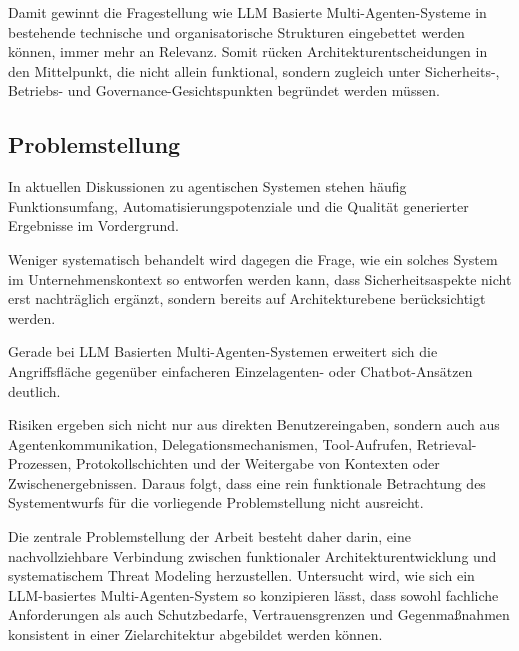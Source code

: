\newpage
Damit gewinnt die Fragestellung wie LLM Basierte Multi-Agenten-Systeme in bestehende technische und organisatorische Strukturen eingebettet werden können, immer mehr an Relevanz. Somit rücken Architekturentscheidungen in den Mittelpunkt, die nicht allein funktional, sondern zugleich unter Sicherheits-, Betriebs- und Governance-Gesichtspunkten begründet werden müssen. \cite{wong_adding_2000,krawiecka_extending_2025}

\subsection{Problemstellung}

In aktuellen Diskussionen zu agentischen Systemen stehen häufig Funktionsumfang, Automatisierungspotenziale und die Qualität generierter Ergebnisse im Vordergrund. \cite{krawiecka_extending_2025,ferrag_prompt_2026,zhang_agent_2026}

Weniger systematisch behandelt wird dagegen die Frage, wie ein solches System im Unternehmenskontext so entworfen werden kann, dass Sicherheitsaspekte nicht erst nachträglich ergänzt, sondern bereits auf Architekturebene berücksichtigt werden. \cite{tete_threat_2024,wong_adding_2000,ferrag_prompt_2026}

Gerade bei LLM Basierten Multi-Agenten-Systemen erweitert sich die Angriffsfläche gegenüber einfacheren Einzelagenten- oder Chatbot-Ansätzen deutlich. \cite{wong_adding_2000,ferrag_prompt_2026,anbiaee_security_2026}

Risiken ergeben sich nicht nur aus direkten Benutzereingaben, sondern auch aus Agentenkommunikation, Delegationsmechanismen, Tool-Aufrufen, Retrieval-Prozessen, Protokollschichten und der Weitergabe von Kontexten oder Zwischenergebnissen. \cite{wong_adding_2000,krawiecka_extending_2025,ferrag_prompt_2026, andric_pdf_nodate, zhang_agent_2026} 
Daraus folgt, dass eine rein funktionale Betrachtung des Systementwurfs für die vorliegende Problemstellung nicht ausreicht. \cite{wong_adding_2000,tete_threat_2024}

Die zentrale Problemstellung der Arbeit besteht daher darin, eine nachvollziehbare Verbindung zwischen funktionaler Architekturentwicklung und systematischem Threat Modeling herzustellen. Untersucht wird, wie sich ein LLM-basiertes Multi-Agenten-System so konzipieren lässt, dass sowohl fachliche Anforderungen als auch Schutzbedarfe, Vertrauensgrenzen und Gegenmaßnahmen konsistent in einer Zielarchitektur abgebildet werden können. \cite{krawiecka_extending_2025, ferrag_prompt_2026}

